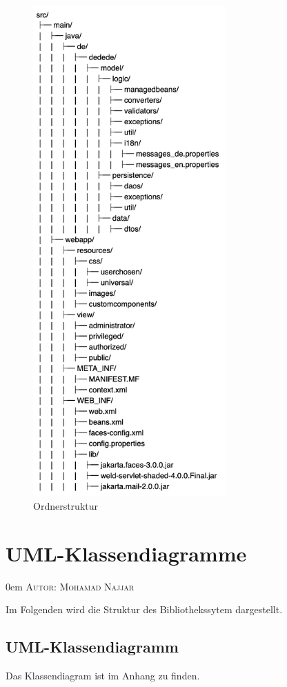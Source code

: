 \documentclass{article}
\makeatletter
\newcommand{\sectionauthor}[1]{
	{\parindent 0em \large \scshape Autor: #1 \par \nobreak \vspace*{1em}}
	\@afterheading
}
\makeatother
\begin{document}
\begin{figure}[H]
\centering
\includegraphics[width = 20em]{FileStructure}
\caption{Ordnerstruktur}
\end{figure}

\section{UML-Klassendiagramme}
\sectionauthor{Mohamad Najjar}

Im Folgenden wird die Struktur des Bibliothekssytem dargestellt.
\subsection{UML-Klassendiagramm}
Das Klassendiagram ist im Anhang zu finden.
\end{document}
